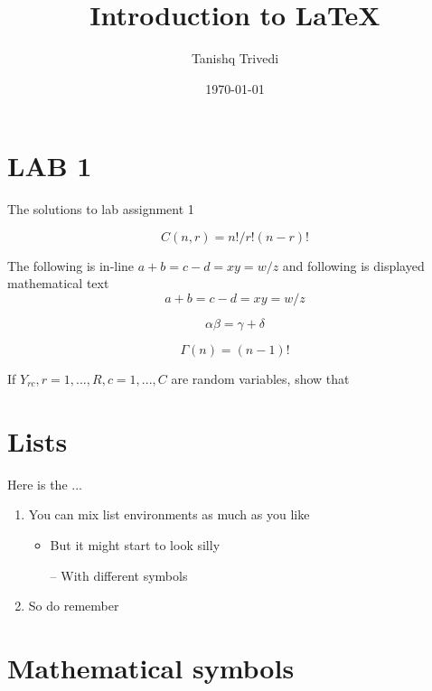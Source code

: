 \documentclass{article}
\begin{document}
\title{Introduction to \LaTeX{}}
\author{Tanishq Trivedi}
\date{\today}

\maketitle

\section{LAB 1}
The solutions to lab assignment 1

$$ 
C(n,r) = n!/r!(n-r)! 
$$

The following is in-line $ a + b = c - d = xy = w/z $ and following is displayed mathematical text 
$$
    a + b = c - d = xy = w/z
$$

\begin{equation}
    \label{simple equation}
    \alpha\beta = \gamma + \delta\textbf{}
\end{equation}

\begin{equation}
    \label{simple equation}
    \Gamma(n) = (n-1)!
\end{equation}


If $ Y_{rc} , r = 1,...,R,c = 1,...,C $ are random variables, show that


\section{Lists}
Here is the ...
\begin{enumerate}
    \item You can mix list environments as much as you like 
    \begin{itemize}
        \item But it might start to look silly
        \item [--] With different symbols
    \end{itemize}
    
    \item So do remember 
\end{enumerate}

\section{Mathematical symbols}
\end{document}

